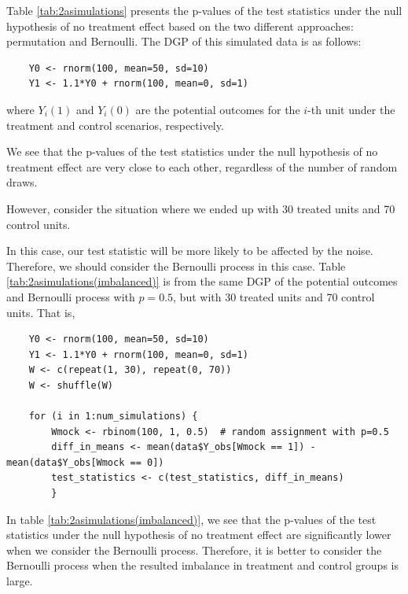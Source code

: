 \documentclass[11pt]{article}
\numberwithin{equation}{section}
\begin{document}



Table \ref{tab:2asimulations} presents the p-values of the test statistics under the null hypothesis of no treatment effect based on the two different approaches: permutation and Bernoulli.
The DGP of this simulated data is as follows:

\begin{verbatim}
    Y0 <- rnorm(100, mean=50, sd=10)
    Y1 <- 1.1*Y0 + rnorm(100, mean=0, sd=1)
\end{verbatim}

where $Y_i(1)$ and $Y_i(0)$ are the potential outcomes for the $i$-th unit under the treatment and control scenarios, respectively.

We see that the p-values of the test statistics under the null hypothesis of no treatment effect are very close to each other, regardless of the number of random draws.


However, consider the situation where we ended up with 30 treated units and 70 control units.


In this case, our test statistic will be more likely to be affected by the noise.
Therefore, we should consider the Bernoulli process in this case.
Table \ref{tab:2asimulations(imbalanced)} is from the same DGP of the potential outcomes and Bernoulli process with $p=0.5$, but with 30 treated units and 70 control units.
That is, 

\begin{verbatim}
    Y0 <- rnorm(100, mean=50, sd=10)
    Y1 <- 1.1*Y0 + rnorm(100, mean=0, sd=1)
    W <- c(repeat(1, 30), repeat(0, 70))
    W <- shuffle(W)
    
    for (i in 1:num_simulations) {
        Wmock <- rbinom(100, 1, 0.5)  # random assignment with p=0.5
        diff_in_means <- mean(data$Y_obs[Wmock == 1]) -mean(data$Y_obs[Wmock == 0])
        test_statistics <- c(test_statistics, diff_in_means)
        }
    \end{verbatim}
    
    


In table \ref{tab:2asimulations(imbalanced)}, we see that the p-values of the test statistics under the null hypothesis of no treatment effect are significantly lower when we consider the Bernoulli process.
Therefore, it is better to consider the Bernoulli process when the resulted imbalance in treatment and control groups is large.


\appendix
\setcounter{figure}{0}                      
\setcounter{table}{0}                      
\renewcommand\thefigure{A.\arabic{figure}} 
\renewcommand\thetable{A.\arabic{table}} 
\end{document}
